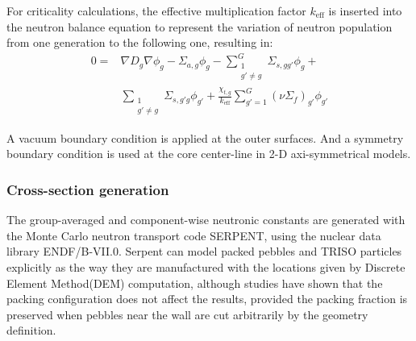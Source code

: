 \documentclass{elsarticle}
\newcommand{\keff}{{\ensuremath{k_{\mathrm{eff}}}} }
\begin{document}


For criticality calculations, the effective multiplication factor \keff is inserted into the neutron balance equation to represent the variation of neutron population from one generation to the following one, resulting in:
  \begin{align}
    0 =& \nabla D_g \nabla \phi_g - \Sigma_{a,g}\phi_g - \sum_{\substack{1\\g'\neq g}}^G \Sigma_{s, gg'}\phi_{g} + \\\nonumber &\sum_{\substack{1\\g'\neq g}} \Sigma_{s, g'g}\phi_{g'} + \frac{\chi_{t,g}}{k_{\mathrm{eff}}}\sum_{g'=1}^G(\nu \Sigma_f)_{g'} \phi_{g'}
  \end{align}



A vacuum boundary condition is applied at the outer surfaces. And a symmetry boundary condition is used at the core center-line in 2-D axi-symmetrical models.



\subsubsection{Cross-section generation}
The group-averaged and component-wise neutronic constants are generated with the Monte Carlo neutron transport code SERPENT\cite{Serpent2015}, using the nuclear data library ENDF/B-VII.0.  
Serpent can model packed pebbles and TRISO particles explicitly as the way they are manufactured with the locations given by Discrete Element Method(DEM) computation, although studies\cite{Fratoni2007} have shown that the packing configuration does not affect the results, provided the packing fraction is preserved when pebbles near the wall are cut arbitrarily by the geometry definition. 
\end{document}
